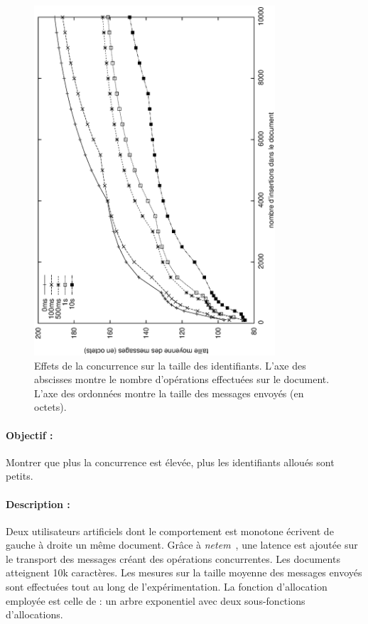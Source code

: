 \begin{figure}
  \begin{center}
    \includegraphics[angle=-90,width=0.8\textwidth]{img/lseq/latency.eps}
    \vspace{25pt}
    \caption[Effet de la concurrence sur les identifiants]
    {\label{repl:img:latency}Effets de la concurrence sur la taille des
      identifiants. L'axe des abscisses montre le nombre d'opérations effectuées
      sur le document. L'axe des ordonnées montre la taille des messages envoyés
      (en octets).}
  \end{center}
\end{figure}

\paragraph{Objectif :} Montrer que plus la concurrence est élevée, plus les
identifiants alloués sont petits.

\paragraph{Description :} Deux utilisateurs artificiels dont le comportement est
monotone écrivent de gauche à droite un même document. Grâce à
\emph{netem}~\cite{netem}, une latence est ajoutée sur le transport des
messages créant des opérations concurrentes. Les documents atteignent 10k
caractères. Les mesures sur la taille moyenne des messages envoyés sont
effectuées tout au long de l'expérimentation. La fonction d'allocation employée
est celle de \LSEQ : un arbre exponentiel avec deux sous-fonctions
d'allocations. 

